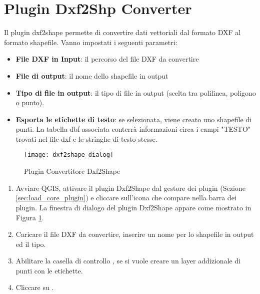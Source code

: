 
\section{Plugin Dxf2Shp Converter}\label{dxf2shape}


Il plugin dxf2shape permette di convertire dati vettoriali dal formato DXF al 
formato shapefile. Vanno impostati i seguenti parametri:

\begin{itemize}
\item \textbf{File DXF in Input}: il percorso del file DXF da convertire
\item \textbf{File di output}: il nome dello shapefile in output
\item \textbf{Tipo di file in output}: il tipo di file in output (scelta tra polilinea, poligono o punto).
\item \textbf{Esporta le etichette di testo}: se selezionata, viene creato uno shapefile di punti. 
La tabella dbf associata conterrà informazioni circa i campi "TESTO" trovati nel file dxf e le stringhe 
di testo stesse.
\end{itemize}

\begin{figure}[ht]
   \centering
   \texttt{[image: dxf2shape\_dialog]}   
   \caption{Plugin Convertitore Dxf2Shape \nixcaption}\label{fig:dxf2shape_dialog}
\end{figure}


\begin{enumerate}
  \item Avviare QGIS, attivare il plugin Dxf2Shape dal gestore dei plugin 
  (Sezione \ref{sec:load_core_plugin}) e cliccare sull'icona  
  che compare nella barra dei plugin. La finestra di dialogo del plugin Dxf2Shape 
  appare come mostrato in Figura \ref{fig:dxf2shape_dialog}.
  \item Caricare il file DXF da convertire, inserire un nome per lo shapefile in output ed il tipo.
  \item Abilitare la casella di controllo , se si vuole
  creare un layer addizionale di punti con le etichette.
  \item Cliccare su . 
\end{enumerate}

\FloatBarrier